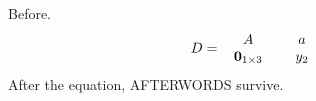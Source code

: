 \documentclass{article}
\begin{document}
Before.
\[ D = \begin{array}{w{c}{1cm}W{c}{1cm}} A & a\\ \mathbf{0}_{1\times 3} & y_2 \end{array} \]
After the equation, AFTERWORDS survive.
\end{document}
